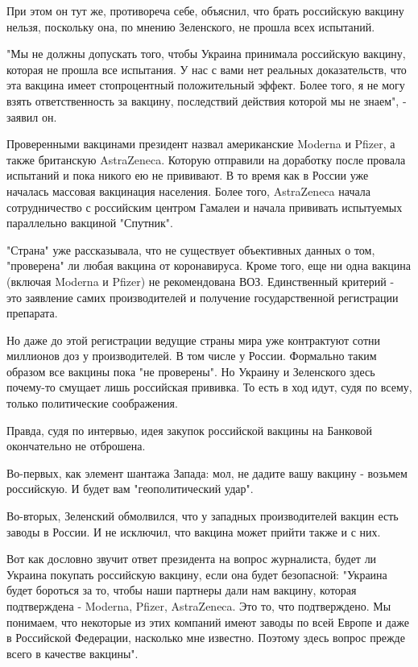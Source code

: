 {При этом он тут же, противореча себе, объяснил, что брать российскую вакцину
нельзя, поскольку она, по мнению Зеленского, не прошла всех испытаний.

"Мы не должны допускать того, чтобы Украина принимала российскую вакцину,
которая не прошла все испытания. У нас с вами нет реальных доказательств, что
эта вакцина имеет стопроцентный положительный эффект. Более того, я не могу
взять ответственность за вакцину, последствий действия которой мы не знаем", -
заявил он. 

Проверенными вакцинами президент назвал американские Moderna и Pfizer, а также
британскую AstraZeneca. Которую отправили на доработку после провала испытаний
и пока никого ею не прививают. В то время как в России уже началась массовая
вакцинация населения. Более того, AstraZeneca начала сотрудничество с
российским центром Гамалеи и начала прививать испытуемых параллельно вакциной
"Спутник". 

"Страна" уже рассказывала, что не существует объективных данных о том,
"проверена" ли любая вакцина от коронавируса. Кроме того, еще ни одна вакцина
(включая Moderna и Pfizer) не рекомендована ВОЗ. Единственный критерий - это
заявление самих производителей и получение государственной регистрации
препарата.

Но даже до этой регистрации ведущие страны мира уже контрактуют сотни миллионов
доз у производителей. В том числе у России. Формально таким образом все вакцины
пока "не проверены". Но Украину и Зеленского здесь почему-то смущает лишь
российская прививка. То есть в ход идут, судя по всему, только политические
соображения. 

Правда, судя по интервью, идея закупок российской вакцины на Банковой
окончательно не отброшена.

Во-первых, как элемент шантажа Запада: мол, не дадите вашу вакцину - возьмем
российскую. И будет вам "геополитический удар". 

Во-вторых, Зеленский обмолвился, что у западных производителей вакцин есть
заводы в России. И не исключил, что вакцина может прийти также и с них. 

Вот как дословно звучит ответ президента на вопрос журналиста, будет ли Украина
покупать российскую вакцину, если она будет безопасной: "Украина будет бороться
за то, чтобы наши партнеры дали нам вакцину, которая подтверждена - Moderna,
Pfizer, AstraZeneca. Это то, что подтверждено. Мы понимаем, что некоторые из
этих компаний имеют заводы по всей Европе и даже в Российской Федерации,
насколько мне известно. Поэтому здесь вопрос прежде всего в качестве вакцины".

}
